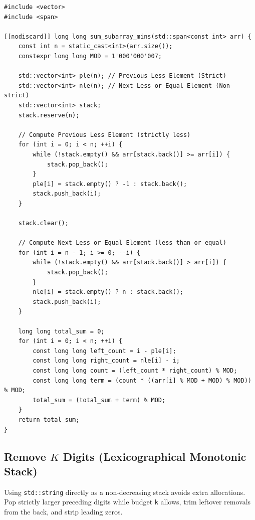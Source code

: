 \documentclass[11pt,a4paper]{article}
\theoremstyle{definition}
\begin{document}
\begin{lstlisting}[caption=Sum of Subarray Minimums with Symmetry Breaking in C++23]
#include <vector>
#include <span>

[[nodiscard]] long long sum_subarray_mins(std::span<const int> arr) {
    const int n = static_cast<int>(arr.size());
    constexpr long long MOD = 1'000'000'007;

    std::vector<int> ple(n); // Previous Less Element (Strict)
    std::vector<int> nle(n); // Next Less or Equal Element (Non-strict)
    std::vector<int> stack;
    stack.reserve(n);

    // Compute Previous Less Element (strictly less)
    for (int i = 0; i < n; ++i) {
        while (!stack.empty() && arr[stack.back()] >= arr[i]) {
            stack.pop_back();
        }
        ple[i] = stack.empty() ? -1 : stack.back();
        stack.push_back(i);
    }

    stack.clear();

    // Compute Next Less or Equal Element (less than or equal)
    for (int i = n - 1; i >= 0; --i) {
        while (!stack.empty() && arr[stack.back()] > arr[i]) {
            stack.pop_back();
        }
        nle[i] = stack.empty() ? n : stack.back();
        stack.push_back(i);
    }

    long long total_sum = 0;
    for (int i = 0; i < n; ++i) {
        const long long left_count = i - ple[i];
        const long long right_count = nle[i] - i;
        const long long count = (left_count * right_count) % MOD;
        const long long term = (count * ((arr[i] % MOD + MOD) % MOD)) % MOD;
        total_sum = (total_sum + term) % MOD;
    }
    return total_sum;
}
\end{lstlisting}

\subsection{Remove $K$ Digits (Lexicographical Monotonic Stack)}

Using \texttt{std::string} directly as a non-decreasing stack avoids extra allocations. Pop strictly larger preceding digits while budget \texttt{k} allows, trim leftover removals from the back, and strip leading zeros.
\end{document}
